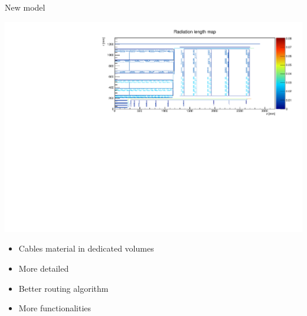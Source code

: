 \documentclass[pdftex, 11pt]{beamer}
\begin{document}
\begin{frame}{New model}
  \begin{center}
    \includegraphics[width=\textwidth]{img/newModel.pdf}
  \end{center}
  \begin{itemize}
  \item Cables material in \alert{dedicated} volumes
  \item More \alert{detailed}
  \item Better routing \alert{algorithm}
  \item More \alert{functionalities}
  \end{itemize}
\end{frame}
\end{document}
